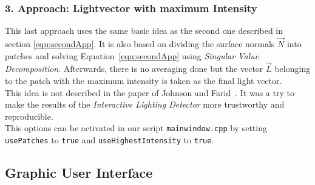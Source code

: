 \subsubsection{3. Approach: Lightvector with maximum Intensity}\label{sec:appThree}

This last approach uses the same basic idea as the second one described in section \ref{equ:secondApp}. It is also based on dividing the surface normals $\vec{N}$ into patches and solving Equation~\ref{equ:secondApp} using \textit{Singular Value Decomposition}. Afterwards, there is no averaging done but the vector $\vec{L}$ belonging to the patch with the maximum intensity is taken as the final light vector. \\
This idea is not described in the paper of Johnson and Farid~\cite{Johnson}. It was a try to make the results of the \textit{Interactive Lighting Detector} more trustworthy and reproducible. \\
This options can be activated in our script \texttt{mainwindow.cpp} by setting \texttt{usePatches} to \texttt{true} and \texttt{useHighestIntensity} to \texttt{true}.


\subsection{Graphic User Interface} \label{sec:GUI}

